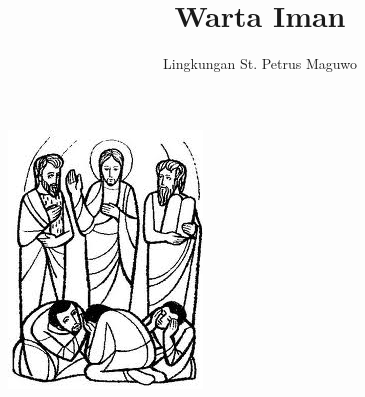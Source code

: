 \documentclass[a5paper,titlepage,11pt,openany]{scrbook}
\author{Lingkungan St. Petrus Maguwo}
\title{Warta Iman}
\begin{document}
\thispagestyle{empty}

\setlength{\parindent}{1cm}
\pagestyle{plain}





\begin{center}
\includegraphics[scale=0.85]{gambar/TRANSFIGURASI.jpeg}
\end{center}


%



\end{document}
